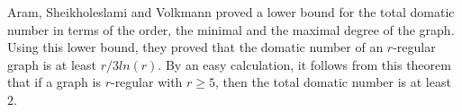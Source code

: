 \begin{remark}
  Aram, Sheikholeslami and Volkmann \cite{regular} proved a lower bound for the total
  domatic number in terms of the order, the minimal and the maximal degree of the
  graph. Using this lower bound, they proved that the domatic number of an $r$-regular graph
  is at least $r/3ln(r)$. By an easy calculation, it follows from this theorem that
  if a graph is $r$-regular with $r \ge 5$, then the total domatic number is at least
  $2$.
\end{remark}
